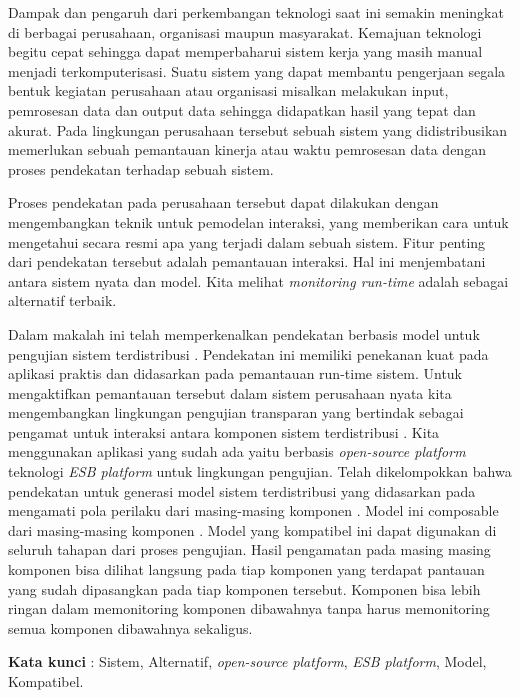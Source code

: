 \documentclass{jtetiproposalskripsi}
\begin{document}
\cover

\approvalpage


\begin{abstractind}
Dampak dan pengaruh dari perkembangan teknologi saat ini semakin meningkat di berbagai perusahaan, organisasi maupun masyarakat. Kemajuan teknologi begitu cepat sehingga dapat memperbaharui sistem kerja yang masih manual menjadi terkomputerisasi. Suatu sistem yang dapat membantu pengerjaan segala bentuk kegiatan perusahaan atau organisasi misalkan melakukan input, pemrosesan data dan output data sehingga didapatkan hasil yang tepat dan akurat. Pada lingkungan perusahaan tersebut sebuah sistem yang didistribusikan memerlukan sebuah pemantauan kinerja atau waktu pemrosesan data dengan proses pendekatan terhadap sebuah sistem.

Proses pendekatan pada perusahaan tersebut dapat dilakukan dengan mengembangkan teknik untuk pemodelan interaksi, yang memberikan cara untuk mengetahui secara resmi apa yang terjadi dalam sebuah sistem. Fitur penting dari pendekatan tersebut adalah pemantauan interaksi. Hal ini menjembatani antara sistem nyata dan model. Kita melihat \emph{monitoring run-time} adalah sebagai alternatif terbaik. 

Dalam makalah ini telah memperkenalkan pendekatan berbasis model untuk pengujian sistem terdistribusi . Pendekatan ini memiliki penekanan kuat pada aplikasi praktis dan didasarkan pada pemantauan run-time sistem. Untuk mengaktifkan pemantauan tersebut dalam sistem perusahaan nyata kita mengembangkan lingkungan pengujian transparan yang bertindak sebagai pengamat untuk interaksi antara komponen sistem terdistribusi . Kita menggunakan aplikasi yang sudah ada yaitu berbasis \emph{open-source platform} teknologi \emph{ESB platform} untuk lingkungan pengujian. Telah dikelompokkan bahwa pendekatan untuk generasi model sistem terdistribusi yang didasarkan pada mengamati pola perilaku dari masing-masing komponen . Model ini composable dari masing-masing komponen . Model yang kompatibel ini dapat digunakan di seluruh tahapan dari proses pengujian. Hasil pengamatan pada masing masing komponen bisa dilihat langsung pada tiap komponen yang terdapat pantauan yang sudah dipasangkan pada tiap komponen tersebut. Komponen bisa lebih ringan dalam memonitoring komponen dibawahnya tanpa harus memonitoring semua komponen dibawahnya sekaligus.

\bigskip
\textbf{Kata kunci} : Sistem, Alternatif, \emph{open-source platform}, \emph{ESB platform}, Model, Kompatibel.
\end{abstractind}
\end{document}
